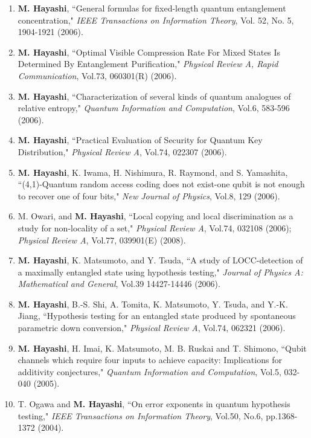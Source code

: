 \documentclass[a4paper,12pt,oneside]{article}
\begin{document}
\begin{enumerate}
\item
\textbf{M. Hayashi}, ``General formulas for fixed-length quantum entanglement concentration," 
{\em IEEE Transactions on Information Theory}, Vol. 52, No. 5, 1904-1921 (2006).

\item
\textbf{M. Hayashi}, ``Optimal Visible Compression Rate For Mixed States Is Determined By Entanglement Purification," 
{\em Physical Review A, Rapid Communication}, Vol.73, 060301(R) (2006). 

\item
\textbf{M. Hayashi}, ``Characterization of several kinds of quantum analogues of relative entropy," 
{\em Quantum Information and Computation}, Vol.6, 583-596 (2006).

\item
\textbf{M. Hayashi}, ``Practical Evaluation of Security for Quantum Key Distribution," 
{\em Physical Review A}, Vol.74, 022307 (2006).

\item
\textbf{M. Hayashi}, K. Iwama, H. Nishimura, R. Raymond, and S. Yamashita, 
``(4,1)-Quantum random access coding does not exist-one qubit is not enough to recover one of four bits," 
{\em New Journal of Physics}, Vol.8, 129 (2006).

\item
M. Owari, and \textbf{M. Hayashi}, 
``Local copying and local discrimination as a study for non-locality of a set," 
{\em Physical Review A}, Vol.74, 032108 (2006); 
{\em Physical Review A}, Vol.77, 039901(E) (2008).

\item
\textbf{M. Hayashi}, K. Matsumoto, and Y. Tsuda, 
``A study of LOCC-detection of a maximally entangled state using hypothesis testing," 
{\em Journal of Physics A: Mathematical and General}, Vol.39 14427-14446 (2006).

\item
\textbf{M. Hayashi}, B.-S. Shi, A. Tomita, K. Matsumoto, Y. Tsuda, and Y.-K. Jiang, 
``Hypothesis testing for an entangled state produced by spontaneous parametric down conversion," 
{\em Physical Review A}, Vol.74, 062321 (2006).

\item
\textbf{M. Hayashi}, H. Imai, K. Matsumoto, M. B. Ruskai and T. Shimono, 
``Qubit channels which require four inputs to achieve capacity: Implications for additivity conjectures," 
{\em Quantum Information and Computation}, Vol.5, 032-040 (2005).

\item
T. Ogawa and \textbf{M. Hayashi}, 
``On error exponents in quantum hypothesis testing," 
{\em IEEE Transactions on Information Theory}, Vol.50, No.6, pp.1368-1372 (2004).


\end{enumerate}
\end{document}
